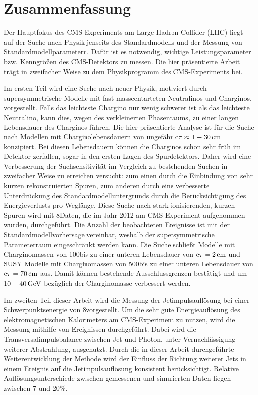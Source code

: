 \chapter*{Zusammenfassung}
Der Hauptfokus des CMS-Experiments am Large Hadron Collider (LHC) liegt auf der Suche nach Physik jenseits des Standardmodells und der Messung von Standardmodellparametern.
Daf\"{u}r ist es notwendig, wichtige Leistungsparameter bzw. Kenngr\"{o}{\ss}en des CMS-Detektors zu messen.
Die hier pr\"{a}sentierte Arbeit tr\"{a}gt in zweifacher Weise zu dem Physikprogramm des CMS-Experiments bei.

Im ersten Teil wird eine Suche nach neuer Physik, motiviert durch supersymmetrische Modelle mit fast masseentarteten Neutralinos und Charginos, vorgestellt.
Falls das leichteste Chargino nur wenig schwerer ist als das leichteste Neutralino, kann dies, wegen des verkleinerten Phasenraums, zu einer langen Lebensdauer des Charginos f\"{u}hren.
Die hier pr\"{a}sentierte Analyse ist f\"{u}r die Suche nach Modellen mit Charginolebensdauern von ungef\"{a}hr $\text{c}\tau\approx 1-30\,\text{cm}$ konzipiert.
Bei diesen Lebensdauern können die Charginos schon sehr fr\"{u}h im Detektor zerfallen, sogar in den ersten Lagen des Spurdetektors.
Daher wird eine Verbesserung der Suchsensitivit\"{a}t im Vergleich zu bestehenden Suchen in zweifacher Weise zu erreichen versucht:
zum einen durch die Einbindung von sehr kurzen rekonstruierten Spuren, zum anderen durch eine verbesserte Unterdr\"{u}ckung des Standardmodelluntergrunds durch die Ber\"{u}cksichtigung des Energieverlusts pro Wegl\"{a}nge.
Diese Suche nach stark ionisierenden, kurzen Spuren wird mit 8\tev Daten, die im Jahr 2012 am CMS-Experiment aufgenommen wurden, durchgef\"{u}hrt.
Die Anzahl der beobachteten Ereignisse ist mit der Standardmodellvorhersage vereinbar, weshalb der supersymmetrische Parameterraum eingeschr\"{a}nkt werden kann.
Die Suche schlie{\ss}t Modelle mit Charginomassen von 100\gev bis zu einer unteren Lebensdauer von $\text{c}\tau=2\,\text{cm}$ und SUSY Modelle mit Charginomassen von 500\gev bis zu einer unteren Lebensdauer von $\text{c}\tau=70\,\text{cm}$ aus.
Damit k\"{o}nnen bestehende Ausschlussgrenzen best\"{a}tigt und um $10-40\,\text{Ge}\kern-0.06667em\text{V}$ bez\"{u}glich der Charginomasse verbessert werden.

Im zweiten Teil dieser Arbeit wird die Messung der Jetimpulsaufl\"{o}sung bei einer Schwerpunktsenergie von 8\tev vorgestellt.
Um die sehr gute Energieaufl\"{o}sung des elektromagnetischen Kalorimeters am CMS-Experiment zu nutzen, wird die Messung mithilfe von \GAMJET Ereignissen durchgef\"{u}hrt.
Dabei wird die Transversalimpulsbalance zwischen Jet und Photon, unter Vernachl\"{a}ssigung weiterer Abstrahlung, ausgenutzt.
Durch die in dieser Arbeit durchgef\"{u}hrte Weiterentwicklung der Methode wird der Einfluss der Richtung weiterer Jets in einem Ereignis auf die Jetimpulsaufl\"{o}sung konsistent ber\"{u}cksichtigt.
Relative Aufl\"{o}sungsunterschiede zwischen gemessenen und simulierten Daten liegen zwischen 7 und 20\%.

\cleardoublepage
